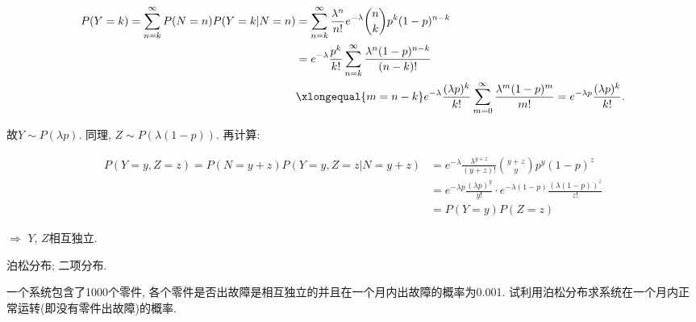 \documentclass[standard]{ExBook}
\begin{document}
\begin{qitems}
\vspace{-5em}

    \begin{bbox}
\vspace{-2em}
\begin{center}
\begin{equation}
\begin{aligned}
    \nonumber
P(Y=k)=\sum\limits_{n=k}^{\infty}P(N=n)P(Y=k|N=n) & =\sum\limits_{n=k}^{\infty}\frac{\lambda^n}{n!}e^{-\lambda}\binom{n}{k}p^{k}(1-p)^{n-k}\\
 & =e^{-\lambda}\frac{p^k}{k!}\sum\limits_{n=k}^{\infty}\frac{\lambda^{n}(1-p)^{n-k}}{(n-k)!}\\
 & \xlongequal{m=n-k} e^{-\lambda}\frac{(\lambda p)^k}{k!}\sum\limits_{m=0}^{\infty}\frac{\lambda^{m}(1-p)^{m}}{m!} = e^{-\lambda p}\frac{(\lambda p)^{k}}{k!}.
\end{aligned}
\end{equation}
\end{center}
故$Y\sim P(\lambda p)$. 同理, $Z\sim P(\lambda(1-p))$.
再计算:
\vspace{-2em}
\begin{center}
\begin{equation}
\begin{aligned}
    \nonumber
P(Y=y,Z=z)=P(N=y+z)P(Y=y,Z=z|N=y+z)&=e^{-\lambda}\frac{\lambda^{y+z}}{(y+z)!}\binom{y+z}{y}p^y(1-p)^z\\
&=e^{-\lambda p}\frac{(\lambda p)^y}{y!}\cdot e^{-\lambda(1-p)}\frac{(\lambda(1-p))^z}{z!}\\
&=P(Y=y)P(Z=z)
\end{aligned}
\end{equation}
\end{center}
$\Longrightarrow$ $Y$, $Z$相互独立.

\textcolor{themeColor}{\selectfont {} 泊松分布; 二项分布.}
    \end{bbox}

\vspace{-5em}

    \begin{bbox}
    \begin{shaded}
        \qitem
一个系统包含了1000个零件, 各个零件是否出故障是相互独立的并且在一个月内出故障的概率为0.001. 试利用泊松分布求系统在一个月内正常运转(即没有零件出故障)的概率.
    \end{shaded}
    \end{bbox}

\vspace{-5em}


\end{qitems}
\end{document}

